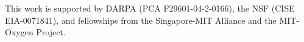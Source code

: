 This work is supported by DARPA (PCA F29601-04-2-0166),
the NSF (CISE EIA-0071841), and fellowships from the
Singapore-MIT Alliance and the MIT-Oxygen Project.

%
%
% 

